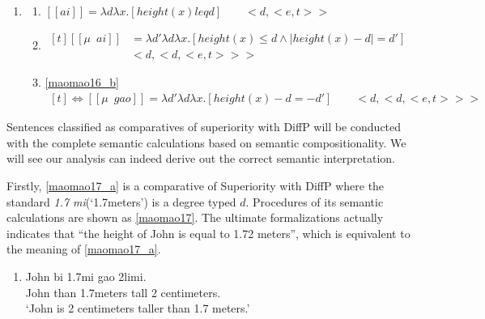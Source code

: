 \documentclass{ctexart}
\begin{document}
\begin{enumerate}
    \item \label{maomao16}
    \begin{enumerate}
        \item \label{maomao16_a}
        $[\![ai]\!] = \lambda d \lambda x.[height(x) leq d] \qquad <d,<e,t>>$

        \item \label{maomao16_b}
        $\begin{aligned}[t]
            [\![\mu \enspace ai]\!] &= \lambda d' \lambda d \lambda x.[height(x) \leq d \land |height(x) - d|=d'] \\
            & <d,<d,<e,t>>>
        \end{aligned}$
        
        \item \label{maomao16_c}
        \ref{maomao16_b}
        $\begin{aligned}[t]
            \Leftrightarrow [\![\mu \enspace gao]\!] = \lambda d' \lambda d \lambda x.[height(x)-d=-d'] \qquad <d,<d,<e,t>>>
        \end{aligned}$
    \end{enumerate}
\end{enumerate}

Sentences classified as comparatives of superiority with DiffP will be conducted with the complete semantic calculations based on semantic compositionality. We will see our analysis can indeed derive out the correct semantic interpretation.

Firstly, \ref{maomao17_a} is a comparative of Superiority with DiffP where the standard \textit{1.7 mi}(`1.7meters') is a degree typed $d$. Procedures of its semantic calculations are shown as \ref{maomao17}. The ultimate formalizations actually indicates that ``the height of John is equal to 1.72 meters'', which is equivalent to the meaning of \ref{maomao17_a}.

\begin{enumerate}
    \item \label{maomao17_a}
    John bi 1.7mi gao 2limi. \\
    John than 1.7meters tall 2 centimeters. \\
    `John is 2 centimeters taller than 1.7 meters.'
\end{enumerate}
\end{document}
